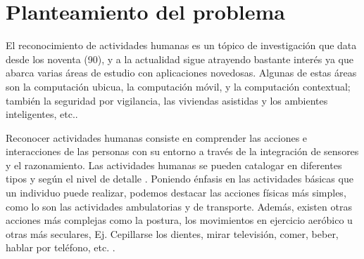 \section{Planteamiento del problema}

\label{sec11:planteamiento}

El reconocimiento de actividades humanas es un tópico de investigación
que data desde los noventa (90), y a la actualidad sigue atrayendo
bastante interés ya que abarca varias áreas de estudio con aplicaciones
novedosas. Algunas de estas áreas son la computación ubicua, la computación
móvil, y la computación contextual; también la seguridad por vigilancia,
las viviendas asistidas y los ambientes inteligentes, etc.\cite{Chen2012}. 

Reconocer actividades humanas consiste en comprender las acciones
e interacciones de las personas con su entorno a través de la integración
de sensores y el razonamiento\cite{ReyesOrtiz2015}. Las actividades
humanas se pueden catalogar en diferentes tipos y según el nivel de
detalle \cite{Chen2012}. Poniendo énfasis en las actividades básicas
que un individuo puede realizar, podemos destacar las acciones físicas
más simples, como lo son las actividades ambulatorias y de transporte.
Además, existen otras acciones más complejas como la postura, los
movimientos en ejercicio aeróbico u otras más seculares, Ej. Cepillarse
los dientes, mirar televisión, comer, beber, hablar por teléfono,
etc. \cite{LaraLabrador2013}.

